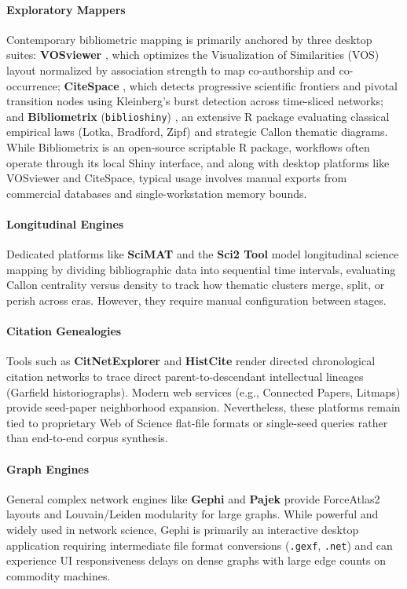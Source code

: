 \documentclass[preprint,12pt]{elsarticle}
\begin{document}
\paragraph{Exploratory Mappers} Contemporary bibliometric mapping is primarily anchored by three desktop suites: \textbf{VOSviewer} \cite{van2010software}, which optimizes the Visualization of Similarities (VOS) layout normalized by association strength to map co-authorship and co-occurrence; \textbf{CiteSpace} \cite{chen2006citespace}, which detects progressive scientific frontiers and pivotal transition nodes using Kleinberg's burst detection \cite{kleinberg2003bursty} across time-sliced networks; and \textbf{Bibliometrix} (\texttt{biblioshiny}) \cite{aria2017bibliometrix}, an extensive R package evaluating classical empirical laws (Lotka, Bradford, Zipf) and strategic Callon thematic diagrams. While Bibliometrix is an open-source scriptable R package, workflows often operate through its local Shiny interface, and along with desktop platforms like VOSviewer and CiteSpace, typical usage involves manual exports from commercial databases and single-workstation memory bounds.

\paragraph{Longitudinal Engines} Dedicated platforms like \textbf{SciMAT} \cite{cobo2012scimat} and the \textbf{Sci2 Tool} \cite{borner2010science} model longitudinal science mapping by dividing bibliographic data into sequential time intervals, evaluating Callon centrality versus density to track how thematic clusters merge, split, or perish across eras. However, they require manual configuration between stages.

\paragraph{Citation Genealogies} Tools such as \textbf{CitNetExplorer} \cite{van2014citnetexplorer} and \textbf{HistCite} \cite{garfield2004histcite} render directed chronological citation networks to trace direct parent-to-descendant intellectual lineages (Garfield historiographs). Modern web services (e.g., Connected Papers, Litmaps) provide seed-paper neighborhood expansion. Nevertheless, these platforms remain tied to proprietary Web of Science flat-file formats or single-seed queries rather than end-to-end corpus synthesis.

\paragraph{Graph Engines} General complex network engines like \textbf{Gephi} \cite{bastian2009gephi} and \textbf{Pajek} \cite{batagelj1998pajek} provide ForceAtlas2 layouts and Louvain/Leiden modularity for large graphs. While powerful and widely used in network science, Gephi is primarily an interactive desktop application requiring intermediate file format conversions (\texttt{.gexf}, \texttt{.net}) and can experience UI responsiveness delays on dense graphs with large edge counts on commodity machines.
\end{document}
